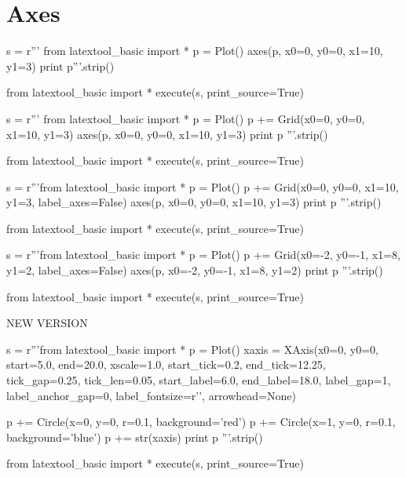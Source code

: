 \section{Axes}
\begin{python}
s = r'''
from latextool_basic import *
p = Plot()
axes(p, x0=0, y0=0, x1=10, y1=3)
print p'''.strip()

from latextool_basic import *
execute(s, print_source=True)
\end{python}

\begin{python}
s = r'''
from latextool_basic import *
p = Plot()
p += Grid(x0=0, y0=0, x1=10, y1=3)
axes(p, x0=0, y0=0, x1=10, y1=3)
print p
'''.strip()

from latextool_basic import *
execute(s, print_source=True)
\end{python}

\begin{python}
s = r'''from latextool_basic import *
p = Plot()
p += Grid(x0=0, y0=0, x1=10, y1=3, label_axes=False)
axes(p, x0=0, y0=0, x1=10, y1=3)
print p
'''.strip()

from latextool_basic import *
execute(s, print_source=True)
\end{python}

\begin{python}
s = r'''from latextool_basic import *
p = Plot()
p += Grid(x0=-2, y0=-1, x1=8, y1=2, label_axes=False)
axes(p, x0=-2, y0=-1, x1=8, y1=2)
print p
'''.strip()

from latextool_basic import *
execute(s, print_source=True)
\end{python}

\newpage
NEW VERSION

\begin{python}
s = r'''from latextool_basic import *
p = Plot()
xaxis = XAxis(x0=0, y0=0,
              start=5.0, end=20.0,
              xscale=1.0,          
              start_tick=0.2, end_tick=12.25, 
              tick_gap=0.25,                 
              tick_len=0.05,
              start_label=6.0, end_label=18.0,
              label_gap=1,                      
              label_anchor_gap=0,               
              label_fontsize=r'\small',
              arrowhead=None)

p += Circle(x=0, y=0, r=0.1, background='red')
p += Circle(x=1, y=0, r=0.1, background='blue')
p += str(xaxis)              
print p
'''.strip()

from latextool_basic import *
execute(s, print_source=True)
\end{python}
